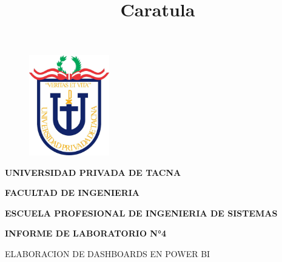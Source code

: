 \documentclass[12pt,letterpaper]{article}
\begin{document}
%

  
\title{Caratula}

\begin{titlepage}
    \begin{center}
    \begin{figure}[htb]
    \begin{center}
    \includegraphics[width=3.5cm]{./img/upt.jpg}
    \end{center}
    \end{figure}
    
    \vspace*{0.15in}
    \begin{Large}
    \textbf{UNIVERSIDAD PRIVADA DE TACNA}\\
    \end{Large}
    
    \vspace*{0.1in}
    \begin{Large}
    \textbf{FACULTAD DE INGENIERIA} \\
    \end{Large}
    
    \vspace*{0.1in}
    \begin{Large}
    \textbf{ESCUELA PROFESIONAL DE INGENIERIA DE SISTEMAS} \\
    \end{Large}
    
    \vspace*{0.5in}
    \begin{Large}
    \textbf{ INFORME DE LABORATORIO N°4}\\
    \end{Large}
    

\vspace*{0.1in}
\begin{Large}
    ELABORACION DE DASHBOARDS EN POWER BI \\
\end{Large}


\end{center}
\end{titlepage}
\end{document}
